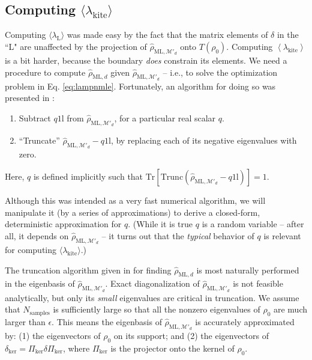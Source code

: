 \documentclass[aps,pra, twocolumn]{revtex4-1}
\newcommand{\M}{\mathcal{M}}
\newcommand{\Tr}{\mathrm{Tr}}
\newcommand{\Id}{\mathbb{I}}
\newcommand{\expect}[1]{\ensuremath{\left\langle#1\right\rangle}}
\def\Id{1\!\mathrm{l}}
\newcommand{\rhohat}{\hat{\rho}}
\newcommand{\rhoML}[1]{\rhohat_{\scriptscriptstyle{\mathrm{ML},#1}}}
\begin{document}
\subsection{Computing $\langle \lambda_\mathrm{kite}\rangle$}
\label{subsec:kite}
Computing $\langle \lambda_{\mathrm{L}}\rangle$ was made easy by the fact that the matrix elements of $\delta$ in the ``L" are unaffected by the projection of $\rhoML{\M'_{d}}$ onto $T(\rho_{0})$. Computing $\expect{\lambda_{\mathrm{kite}}}$ is a bit harder, because the boundary \emph{does} constrain its elements. We need a procedure to compute $\rhoML{d}$ given $\rhoML{\M'_{d}}$ -- i.e., to solve the optimization problem in Eq. \eqref{eq:lampnmle}.  Fortunately, an algorithm for doing so was presented in \cite{Smolin2012}:
\begin{enumerate}[noitemsep]
\item Subtract $q\Id$ from $\rhoML{\M'_{d}}$, for a particular real scalar $q$.
\item ``Truncate'' $\rhoML{\M'_{d}}-q\Id$, by replacing each of its negative eigenvalues with zero.
\end{enumerate}
Here, $q$ is defined implicitly such that $\Tr\left[ \mathrm{Trunc}(\rhoML{\M'_{d}}-q\Id)\right] = 1$.

Although this was intended as a very fast numerical algorithm, we will manipulate it (by a series of approximations) to derive a closed-form, deterministic approximation for $q$. (While it is true $q$ is a random variable -- after all, it depends on $\rhoML{\M'_{d}}$ -- it turns out that the \emph{typical} behavior of $q$ is relevant for computing $\langle \lambda_{\mathrm{kite}}\rangle$.)

The truncation algorithm given in \cite{Smolin2012} for finding $\rhoML{d}$ is most naturally performed in the eigenbasis of $\rhoML{\M'_{d}}$.  Exact diagonalization of $\rhoML{\M'_{d}}$ is not feasible analytically, but only its \emph{small} eigenvalues are critical in truncation.  We assume that $N_{\mathrm{samples}}$ is sufficiently large so that all the nonzero eigenvalues of $\rho_0$ are much larger than $\epsilon$. This means the eigenbasis of $\rhoML{\M'_{d}}$ is accurately approximated by: (1) 
the eigenvectors of $\rho_0$ on its support; and (2) the eigenvectors of $\delta_{\mathrm{ker}} = \Pi_{\mathrm{ker}}\delta\Pi_{\mathrm{ker}}$, where $\Pi_{\mathrm{ker}}
$ is the projector onto the kernel of $\rho_0$.
\end{document}
